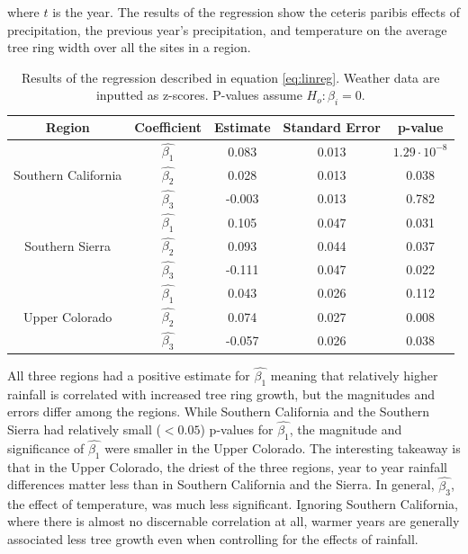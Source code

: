 \documentclass[]{article}
\begin{document}
where $t$ is the year. The results of the regression show the ceteris paribis effects of precipitation, the previous year's precipitation, and temperature on the average tree ring width over all the sites in a region.

\begin{table}
\begin{center}
\begin{tabular}{| c | c | c c c|}
\hline
Region & Coefficient & Estimate & Standard Error & p-value\\
\hline
\multirow{3}{*}{Southern California}
& $\hat{\beta_1} $&0.083&0.013& $1.29\cdot 10^{-8}$\\
& $\hat{\beta_2} $&0.028& 0.013& 0.038 \\
&$\hat{\beta_3}$& -0.003 & 0.013&0.782\\  \hline
\multirow{3}{*}{Southern Sierra}
& $\hat{\beta_1} $&0.105&0.047& 0.031 \\
& $\hat{\beta_2} $&0.093& 0.044& 0.037 \\
&$\hat{\beta_3}$& -0.111 & 0.047 &0.022\\ \hline
\multirow{3}{*}{Upper Colorado} 
& $\hat{\beta_1} $&0.043&0.026& 0.112\\
& $\hat{\beta_2} $&0.074& 0.027& 0.008 \\
&$\hat{\beta_3}$& -0.057 & 0.026&0.038\\  \hline

\end{tabular}
\end{center}
\caption{Results of the regression described in equation \ref{eq:linreg}. Weather data are inputted as z-scores. P-values assume $ H_o: \beta_i = 0$.}
\end{table}

All three regions had a positive estimate for $\hat{\beta_1}$ meaning that relatively higher rainfall is correlated with increased tree ring growth, but the magnitudes and errors differ among the regions. While Southern California and the Southern Sierra had relatively small ($<0.05$) p-values for $\hat{\beta_1}$, the magnitude and significance of $\hat{\beta_1}$  were smaller in the Upper Colorado.  The interesting takeaway is that in the Upper Colorado, the driest of the three regions, year to year rainfall differences matter less than in Southern California and the Sierra. In general,  $\hat{\beta_3}$, the effect of temperature, was much less significant. Ignoring Southern California, where there is almost no discernable correlation at all, warmer years are generally associated less tree growth even when controlling for the effects of rainfall.
\end{document}
